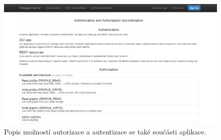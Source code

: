 \documentclass[thesis=M,czech]{FITthesis}[2014/05/6]
\begin{document}
\begin{figure}\centering
 	\includegraphics[width=1\textwidth]{images/prtsc/server-07-docs_auth}
 	\caption[Dokumentace autentizace a autorizace]{Popis možností autorizace a autentizace se také součásti aplikace.}\label{fig:server-07-docs_auth}
\end{figure}

\clearpage
\end{document}
